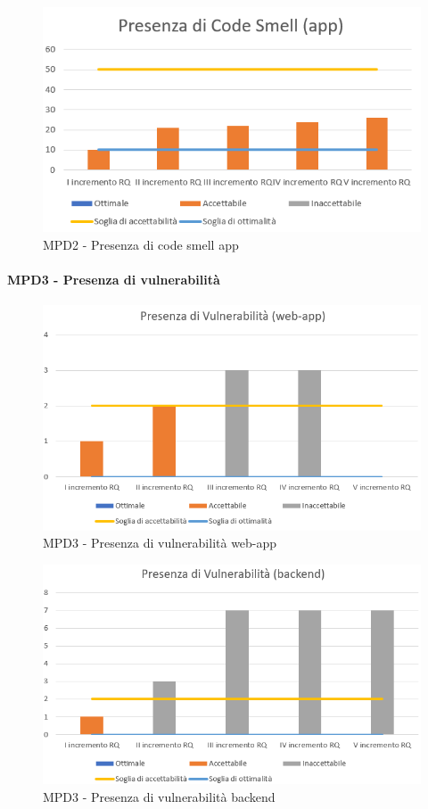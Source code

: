   \begin{figure}[h!]
    \centering
      \includegraphics[scale=1]{Immagini/CodeSmell APP.PNG}
    \caption{MPD2 - Presenza di code smell app}
  \end{figure}



  \newpage
  \paragraph{MPD3 - Presenza di vulnerabilità}
  \begin{figure}[h!]
    \centering
      \includegraphics[scale=1]{Immagini/Vuln WA.PNG}
    \caption{MPD3 - Presenza di vulnerabilità web-app}
  \end{figure}

  \begin{figure}[h!]
    \centering
      \includegraphics[scale=1]{Immagini/Vuln BE.PNG}
    \caption{MPD3 - Presenza di vulnerabilità backend}
  \end{figure}

